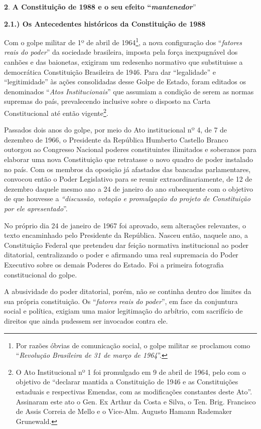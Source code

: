 \textbf{2}. \textbf{A Constituição de 1988 e o seu efeito
``\emph{mantenedor}}''

\textbf{2.1.) Os Antecedentes históricos da Constituição de 1988}

Com o golpe militar de 1º de abril de 1964\footnote{Por razões óbvias de
  comunicação social, o golpe militar se proclamou como
  ``\emph{Revolução Brasileira de 31 de março de 1964}''.}, a nova
configuração dos ``\emph{fatores reais do poder}'' da sociedade
brasileira, imposta pela força inexpugnável dos canhões e das baionetas,
exigiram um redesenho normativo que substituisse a democrática
Constituição Brasileira de 1946. Para dar ``legalidade'' e
``legitimidade'' às ações consolidadas desse Golpe de Estado, foram
editados os denominados ``\emph{Atos Institucionais}'' que assumiam a
condição de serem as normas supremas do país, prevalecendo inclusive
sobre o disposto na Carta Constitucional até então vigente\footnote{O
  Ato Institucional nº 1 foi promulgado em 9 de abril de 1964, pelo com
  o objetivo de ``declarar mantida a Constituição de 1946 e as
  Constituições estaduais e respectivas Emendas, com as modificações
  constantes deste Ato''. Assinaram este ato o Gen. Ex Arthur da Costa e
  Silva, o Ten. Brig. Francisco de Assis Correia de Mello e o Vice-Alm.
  Augusto Hamann Rademaker Grunewald.}.

Passados dois anos do golpe, por meio do Ato institucional nº 4, de 7 de
dezembro de 1966, o Presidente da República Humberto Castello Branco
outorgou ao Congresso Nacional poderes constituintes ilimitados e
soberanos para elaborar uma nova Constituição que retratasse o novo
quadro de poder instalado no país. Com os membros da oposição já
afastados das bancadas parlamentares, convocou então o Poder Legislativo
para se reunir extraordinariamente, de 12 de dezembro daquele mesmo ano
a 24 de janeiro do ano subsequente com o objetivo de que houvesse a
\emph{``discussão, votação e promulgação do projeto de Constituição por
ele apresentado}''.

No próprio dia 24 de janeiro de 1967 foi aprovado, sem alterações
relevantes, o texto encaminhado pelo Presidente da República. Nasceu
então, naquele ano, a Constituição Federal que pretendeu dar feição
normativa institucional ao poder ditatorial, centralizando o poder e
afirmando uma real supremacia do Poder Executivo sobre os demais Poderes
do Estado. Foi a primeira fotografia constitucional do golpe.

A abusividade do poder ditatorial, porém, não se continha dentro dos
limites da sua própria constituição. Os ``\emph{fatores reais do
poder}'', em face da conjuntura social e política, exigiam uma maior
legitimação do arbítrio, com sacrifício de direitos que ainda pudessem
ser invocados contra ele.

